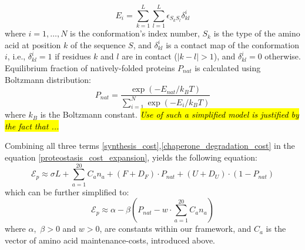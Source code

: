 \documentclass[10pt,letterpaper]{article}
\begin{document}
\begin{equation}
	\label{protein_globule_energy}
	E_{i} = \sum\limits_{k=1}^{L}\sum\limits_{l=1}^{L}\epsilon_{S_{k}S_{l}}\delta^{i}_{kl}
\end{equation}
where $i=1,\dots,N$ is the conformation's index number, $S_{k}$ is the type of the amino acid at position $k$ of the sequence $S$, and $\delta^{i}_{kl}$ is a contact map of the conformation $i$, i.e., $\delta^{i}_{kl}=1$ if residues $k$ and $l$ are in contact ($|k-l|>1$), and $\delta^{i}_{kl}=0$ otherwise. Equilibrium fraction of natively-folded proteins $P_{nat}$ is calculated using Boltzmann distribution:
\begin{equation}
	\label{pnat_boltzmann}
	P_{nat} = \frac{\exp\left(-E_{nat}/k_{B}T\right)}{\sum\limits_{i=1}^{N}\exp\left(-E_{i}/k_{B}T\right)}
\end{equation}
where $k_{B}$ is the Boltzmann constant. \hl{\it Use of such a simplified model is justified by the fact that ...}

Combining all three terms \eqref{synthesis_cost},\eqref{chaperone_degradation_cost} in the equation \eqref{proteostasis_cost_expansion}, yields the following equation:
\begin{equation}
	\label{proteostasis_cost_detailed}
	\mathcal{E}_{p} \approx \sigma L + \sum\limits_{a=1}^{20}C_{a}n_{a} + (F+D_{F})\cdot P_{nat} + (U+D_{U})\cdot\left(1-P_{nat}\right)
\end{equation}
which can be further simplified to:
\begin{equation}
	\label{proteostasis_cost_simplified}
	\mathcal{E}_{p} \approx \alpha - \beta\left(P_{nat} - \mathit{w}\cdot\sum\limits_{a=1}^{20}C_{a}n_{a} \right)
\end{equation}
where $\alpha$,\, $\beta > 0$ and $\mathit{w}>0$, are constants within our framework, and $C_{a}$ is the vector of amino acid maintenance-costs, introduced above. 
\end{document}
